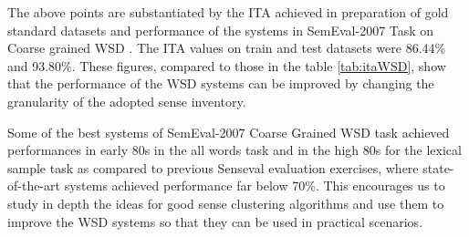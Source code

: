 The above points are substantiated by the ITA achieved in preparation of gold standard datasets and performance of the systems in SemEval-2007 Task on Coarse grained WSD \citep{navigli-litkowski:SemEval-2007}. The ITA values on train and test datasets were 86.44\% and 93.80\%. These figures, compared to those in the table \ref{tab:itaWSD}, show that the performance of the WSD systems can be improved by changing the granularity of the adopted sense inventory.

Some of the best systems of SemEval-2007 Coarse Grained WSD task achieved performances in early 80s in the all words task and in the high 80s for the lexical sample task as compared to previous Senseval evaluation exercises, where state-of-the-art systems achieved performance far below 70\%. This encourages us to study in depth the ideas for good sense clustering algorithms and use them to improve the WSD systems so that they can be used in practical scenarios.

\begin{comment}
To understand the granularity of WordNet, lets take an example.
\begin{example}
Consider the senses of the word \textit{evidence} as a \textit{noun} from WordNet version 3.1\footnote{Online WordNet Search: \url{http://wordnetweb.princeton.edu/perl/webwn}} in the table \ref{tab:evidenceExample}.
For most of the applications the sense distinctions are too-fine and are not required. 
One might say that they are all clearly related. \cite{mccarthy2006relating}
\begin{table}[h]
\centering
\begin{tabular}{ | l | p{12cm} |} 
\hline
WordNet Sense & Gloss \\ \hline
evidence\#n\#1 & evidence, grounds (your basis for belief or disbelief; knowledge on which to base belief)  ``the evidence that smoking causes lung cancer is very compelling`` \\ \hline
evidence\#n\#2 & evidence (an indication that makes something evident) ''his trembling was evidence of his fear'' \\ \hline
evidence\#n\#3 & evidence ((law) all the means by which any alleged matter of fact whose truth is investigated at judicial trial is established or disproved) \\ \hline    
\end{tabular}
\caption{Senses of the word \textit{evidence}} 
\label{tab:evidenceExample}
\end{table}
\end{example}
\end{comment}

